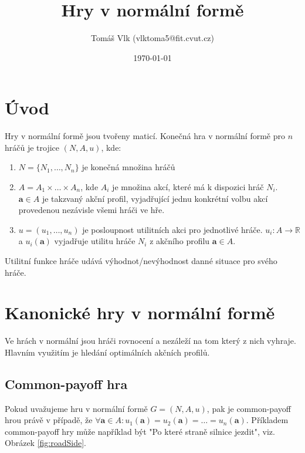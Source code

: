 \documentclass{article}
\title{Hry v normální formě\vspace{-1em}}
\author{Tomáš Vlk (vlktoma5@fit.cvut.cz)}
\date{\today}
\begin{document}
\maketitle

\section*{Úvod}

Hry v normální formě jsou tvořeny maticí. Konečná hra v normální formě pro $n$ hráčů je trojice $(N, A, u)$, kde:

\begin{enumerate}
\item $N = \{ N_1, \dots, N_n\}$ je konečná množina hráčů
\item $A = A_1 \times \dots \times A_n$, kde $A_i$ je množina akcí, které má k dispozici hráč $N_i$. $\boldsymbol{a} \in A$ je takzvaný akční profil, vyjadřující jednu konkrétní volbu akcí provedenou nezávisle všemi hráči ve hře.
\item $u =  (u_1, \dots, u_n)$ je posloupnost utilitních akci pro jednotlivé hráče. $u_i: A \rightarrow \mathbb{R}$ a $u_i(\boldsymbol{a})$ vyjadřuje utilitu hráče $N_i$ z akčního profilu $\boldsymbol{a} \in A$.
\end{enumerate}

Utilitní funkce hráče udává výhodnot/nevýhodnost danné situace pro svého hráče.

\section*{Kanonické hry v normální formě}

Ve hrách v normální jsou hráči rovnocení a nezáleží na tom který z nich vyhraje. Hlavním využitím je hledání optimálních akčních profilů.

\subsection*{Common-payoff hra}

Pokud uvažujeme hru v normální formě $G = (N, A, u)$, pak je common-payoff hrou právě v případě, že $\forall \boldsymbol{a} \in A: u_1(\boldsymbol{a}) = u_2(\boldsymbol{a}) = \dots = u_n(\boldsymbol{a})$. Příkladem common-payoff hry může například být "Po které straně silnice jezdit", viz. Obrázek \ref{fig:roadSide}.
\end{document}
